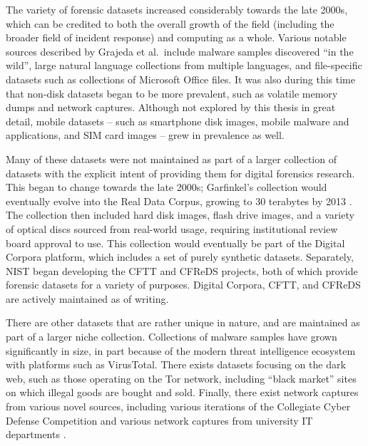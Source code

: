 \documentclass[letterpaper,12pt]{report}
\begin{document}
The variety of forensic datasets increased considerably towards the late
2000s, which can be credited to both the overall growth of the field
(including the broader field of incident response) and computing as a
whole. Various notable sources described by Grajeda et al.~include
malware samples discovered ``in the wild'', large natural language
collections from multiple languages, and file-specific datasets such as
collections of Microsoft Office files. It was also during this time that
non-disk datasets began to be more prevalent, such as volatile memory
dumps and network captures. Although not explored by this thesis in
great detail, mobile datasets -- such as smartphone disk images, mobile
malware and applications, and SIM card images -- grew in prevalence as
well.

Many of these datasets were not maintained as part of a larger
collection of datasets with the explicit intent of providing them for
digital forensics research. This began to change towards the late 2000s;
Garfinkel's collection would eventually evolve into the Real Data
Corpus, growing to 30 terabytes by 2013
\cite{garfinkelBringingScienceDigital2009a,yannikosDataCorporaDigital2014}.
The collection then included hard disk images, flash drive images, and a
variety of optical discs sourced from real-world usage, requiring
institutional review board approval to use. This collection would
eventually be part of the Digital Corpora platform, which includes a set
of purely synthetic datasets. Separately, NIST began developing the CFTT
and CFReDS projects, both of which provide forensic datasets for a
variety of purposes. Digital Corpora, CFTT, and CFReDS are actively
maintained as of writing.

There are other datasets that are rather unique in nature, and are
maintained as part of a larger niche collection. Collections of malware
samples have grown significantly in size, in part because of the modern
threat intelligence ecosystem with platforms such as VirusTotal. There
exists datasets focusing on the dark web, such as those operating on the
Tor network, including ``black market'' sites on which illegal goods are
bought and sold. Finally, there exist network captures from various
novel sources, including various iterations of the Collegiate Cyber
Defense Competition and various network captures from university IT
departments \cite{grajedaAvailabilityDatasetsDigital2017}.
\end{document}
